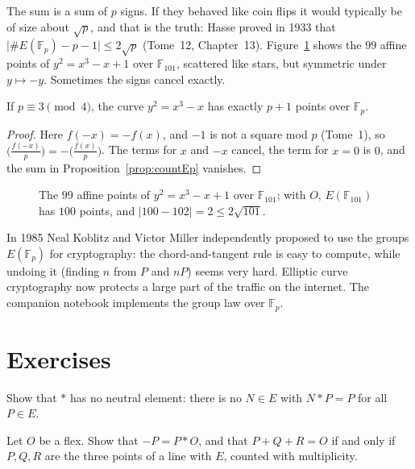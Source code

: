 The sum is a sum of $p$ signs. If they behaved like coin flips it would typically be of size about $\sqrt p$, and that is the truth: Hasse proved in 1933
that $\bigl|\#E(\mathbb F_p)-p-1\bigr|\le2\sqrt p$ (Tome~12, Chapter~13). Figure~\ref{fig:finitecubic} shows the $99$ affine points of $y^2=x^3-x+1$ over
$\mathbb F_{101}$, scattered like stars, but symmetric under $y\mapsto-y$. Sometimes the signs cancel exactly.

\begin{proposition}\label{prop:supersingular}
If $p\equiv3\pmod4$, the curve $y^2=x^3-x$ has exactly $p+1$ points over $\mathbb F_p$.
\end{proposition}

\begin{proof}
Here $f(-x)=-f(x)$, and $-1$ is not a square mod $p$ (Tome~1), so $\bigl(\frac{f(-x)}p\bigr)=-\bigl(\frac{f(x)}p\bigr)$. The terms for $x$ and $-x$ cancel,
the term for $x=0$ is $0$, and the sum in Proposition~\ref{prop:countEp} vanishes.
\end{proof}

\begin{figure}[ht]
\centering
{}
\caption{The $99$ affine points of $y^2=x^3-x+1$ over $\mathbb F_{101}$; with $O$, $E(\mathbb F_{101})$ has $100$ points, and $|100-102|=2\le2\sqrt{101}$.}
\label{fig:finitecubic}
\end{figure}

\begin{remark}
In 1985 Neal Koblitz and Victor Miller independently proposed to use the groups $E(\mathbb F_p)$ for cryptography: the chord-and-tangent rule is easy to
compute, while undoing it (finding $n$ from $P$ and $nP$) seems very hard. Elliptic curve cryptography now protects a large part of the traffic on the
internet. The companion notebook implements the group law over $\mathbb F_p$.
\end{remark}

\section{Exercises}

\begin{exercise}[$\star$]\label{ex:noneutral}
Show that $*$ has no neutral element: there is no $N\in E$ with $N*P=P$ for all $P\in E$.
\end{exercise}

\begin{exercise}[$\star$]\label{ex:collinear}
Let $O$ be a flex. Show that $-P=P*O$, and that $P+Q+R=O$ if and only if $P,Q,R$ are the three points of a line with $E$, counted with multiplicity.
\end{exercise}


